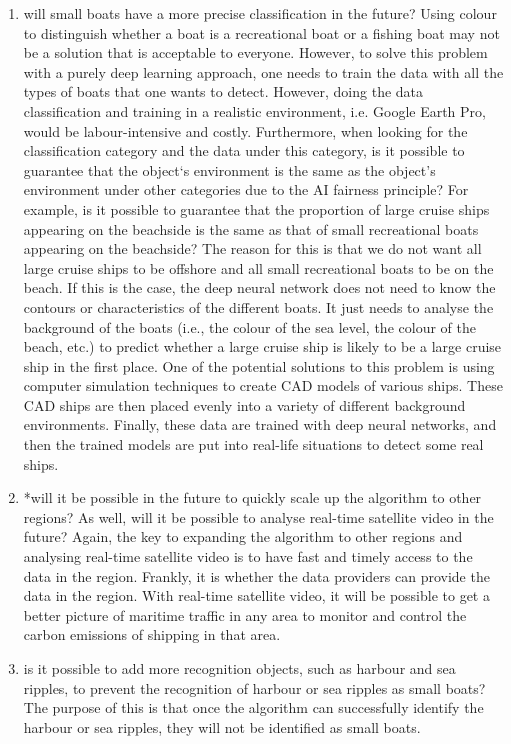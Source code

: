 \begin{enumerate}
    \item will small boats have a more precise classification in the future? Using colour to distinguish whether a boat is a recreational boat or a fishing boat may not be a solution that is acceptable to everyone. However, to solve this problem with a purely deep learning approach, one needs to train the data with all the types of boats that one wants to detect. However, doing the data classification and training in a realistic environment, i.e. Google Earth Pro, would be labour-intensive and costly. Furthermore, when looking for the classification category and the data under this category, is it possible to guarantee that the object‘s environment is the same as the object's environment under other categories due to the AI fairness principle? For example, is it possible to guarantee that the proportion of large cruise ships appearing on the beachside is the same as that of small recreational boats appearing on the beachside? The reason for this is that we do not want all large cruise ships to be offshore and all small recreational boats to be on the beach. If this is the case, the deep neural network does not need to know the contours or characteristics of the different boats. It just needs to analyse the background of the boats (i.e., the colour of the sea level, the colour of the beach, etc.) to predict whether a large cruise ship is likely to be a large cruise ship in the first place. One of the potential solutions to this problem is using computer simulation techniques to create CAD models of various ships. These CAD ships are then placed evenly into a variety of different background environments. Finally, these data are trained with deep neural networks, and then the trained models are put into real-life situations to detect some real ships.
    
    \item *will it be possible in the future to quickly scale up the algorithm to other regions? As well, will it be possible to analyse real-time satellite video in the future? Again, the key to expanding the algorithm to other regions and analysing real-time satellite video is to have fast and timely access to the data in the region. Frankly, it is whether the data providers can provide the data in the region. With real-time satellite video, it will be possible to get a better picture of maritime traffic in any area to monitor and control the carbon emissions of shipping in that area.
    
    \item is it possible to add more recognition objects, such as harbour and sea ripples, to prevent the recognition of harbour or sea ripples as small boats? The purpose of this is that once the algorithm can successfully identify the harbour or sea ripples, they will not be identified as small boats.
    

\end{enumerate}
